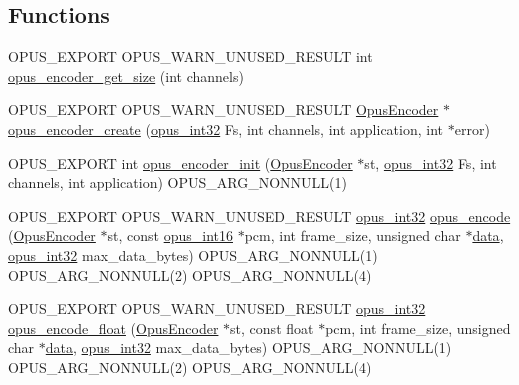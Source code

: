 \subsection*{Functions}
\begin{DoxyCompactItemize}
\item 
O\+P\+U\+S\+\_\+\+E\+X\+P\+O\+RT O\+P\+U\+S\+\_\+\+W\+A\+R\+N\+\_\+\+U\+N\+U\+S\+E\+D\+\_\+\+R\+E\+S\+U\+LT int \mbox{\hyperlink{group__opus__encoder_ga9ac72d062eca0c77711f5b04b9dcc645}{opus\+\_\+encoder\+\_\+get\+\_\+size}} (int channels)
\item 
O\+P\+U\+S\+\_\+\+E\+X\+P\+O\+RT O\+P\+U\+S\+\_\+\+W\+A\+R\+N\+\_\+\+U\+N\+U\+S\+E\+D\+\_\+\+R\+E\+S\+U\+LT \mbox{\hyperlink{group__opus__encoder_gaf461a3ef2f10c2fe8b994a176f06c9bd}{Opus\+Encoder}} $\ast$ \mbox{\hyperlink{group__opus__encoder_ga8a145618886fed2d6fbc79a4071a939d}{opus\+\_\+encoder\+\_\+create}} (\mbox{\hyperlink{opus__types_8h_aa4d309d6f80b99dbabebc8f98879ab9a}{opus\+\_\+int32}} Fs, int channels, int application, int $\ast$error)
\item 
O\+P\+U\+S\+\_\+\+E\+X\+P\+O\+RT int \mbox{\hyperlink{group__opus__encoder_ga363e90db0f434b2d8fde7dcf989270b1}{opus\+\_\+encoder\+\_\+init}} (\mbox{\hyperlink{group__opus__encoder_gaf461a3ef2f10c2fe8b994a176f06c9bd}{Opus\+Encoder}} $\ast$st, \mbox{\hyperlink{opus__types_8h_aa4d309d6f80b99dbabebc8f98879ab9a}{opus\+\_\+int32}} Fs, int channels, int application) O\+P\+U\+S\+\_\+\+A\+R\+G\+\_\+\+N\+O\+N\+N\+U\+LL(1)
\item 
O\+P\+U\+S\+\_\+\+E\+X\+P\+O\+RT O\+P\+U\+S\+\_\+\+W\+A\+R\+N\+\_\+\+U\+N\+U\+S\+E\+D\+\_\+\+R\+E\+S\+U\+LT \mbox{\hyperlink{opus__types_8h_aa4d309d6f80b99dbabebc8f98879ab9a}{opus\+\_\+int32}} \mbox{\hyperlink{group__opus__encoder_gabbb51305050b64614329637d6eff777c}{opus\+\_\+encode}} (\mbox{\hyperlink{group__opus__encoder_gaf461a3ef2f10c2fe8b994a176f06c9bd}{Opus\+Encoder}} $\ast$st, const \mbox{\hyperlink{opus__types_8h_acc9ed7cf60479eb81f9648c6ec27dc26}{opus\+\_\+int16}} $\ast$pcm, int frame\+\_\+size, unsigned char $\ast$\mbox{\hyperlink{_s_d_l__opengl_8h_a2e335d56e2846b0fea47eed068b2d34a}{data}}, \mbox{\hyperlink{opus__types_8h_aa4d309d6f80b99dbabebc8f98879ab9a}{opus\+\_\+int32}} max\+\_\+data\+\_\+bytes) O\+P\+U\+S\+\_\+\+A\+R\+G\+\_\+\+N\+O\+N\+N\+U\+LL(1) O\+P\+U\+S\+\_\+\+A\+R\+G\+\_\+\+N\+O\+N\+N\+U\+LL(2) O\+P\+U\+S\+\_\+\+A\+R\+G\+\_\+\+N\+O\+N\+N\+U\+LL(4)
\item 
O\+P\+U\+S\+\_\+\+E\+X\+P\+O\+RT O\+P\+U\+S\+\_\+\+W\+A\+R\+N\+\_\+\+U\+N\+U\+S\+E\+D\+\_\+\+R\+E\+S\+U\+LT \mbox{\hyperlink{opus__types_8h_aa4d309d6f80b99dbabebc8f98879ab9a}{opus\+\_\+int32}} \mbox{\hyperlink{group__opus__encoder_ga4d7243152a1bc6bf4953d1d5c1e530c6}{opus\+\_\+encode\+\_\+float}} (\mbox{\hyperlink{group__opus__encoder_gaf461a3ef2f10c2fe8b994a176f06c9bd}{Opus\+Encoder}} $\ast$st, const float $\ast$pcm, int frame\+\_\+size, unsigned char $\ast$\mbox{\hyperlink{_s_d_l__opengl_8h_a2e335d56e2846b0fea47eed068b2d34a}{data}}, \mbox{\hyperlink{opus__types_8h_aa4d309d6f80b99dbabebc8f98879ab9a}{opus\+\_\+int32}} max\+\_\+data\+\_\+bytes) O\+P\+U\+S\+\_\+\+A\+R\+G\+\_\+\+N\+O\+N\+N\+U\+LL(1) O\+P\+U\+S\+\_\+\+A\+R\+G\+\_\+\+N\+O\+N\+N\+U\+LL(2) O\+P\+U\+S\+\_\+\+A\+R\+G\+\_\+\+N\+O\+N\+N\+U\+LL(4)

\end{DoxyCompactItemize}
